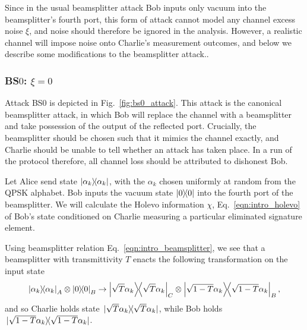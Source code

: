 Since in the usual beamsplitter attack Bob inputs only vacuum into the beamsplitter's fourth port, this form of attack cannot model any channel excess noise $\xi$, and noise should therefore be ignored in the analysis. However, a realistic channel will impose noise onto Charlie's measurement outcomes, and below we describe some modifications to the beamsplitter attack.. 


\subsubsection{BS$0$: $\xi = 0$}\label{sec:qds_bs0}
Attack BS$0$ is depicted in Fig.~\ref{fig:bs0_attack}. This attack is the canonical beamsplitter attack, in which Bob will replace the channel with a beamsplitter and take possession of the output of the reflected port. Crucially, the beamsplitter should be chosen such that it mimics the channel exactly, and Charlie should be unable to tell whether an attack has taken place. In a run of the protocol therefore, all channel loss should be attributed to dishonest Bob.


Let Alice send state $\dyad{\alpha_k}$, with the $\alpha_k$ chosen uniformly at random from the QPSK alphabet. Bob inputs the vacuum state $\dyad{0}$ into the fourth port of the beamsplitter. We will calculate the Holevo information $\chi$, Eq.~\ref{eqn:intro_holevo} of Bob's state conditioned on Charlie measuring a particular eliminated signature element.

Using beamsplitter relation Eq.~\ref{eqn:intro_beamsplitter}, we see that a beamsplitter with transmittivity $T$ enacts the following transformation on the input state
\begin{equation}
\dyad{\alpha_k}_A \otimes \dyad{0}_B \rightarrow \dyad{\sqrt{T} \alpha_k}_C \otimes \dyad{\sqrt{1-T}\alpha_k}_{B},
\end{equation}
and so Charlie holds state $\dyad*{\sqrt{T}\alpha_k}$, while Bob holds $\dyad*{\sqrt{1-T}\alpha_k}$.


